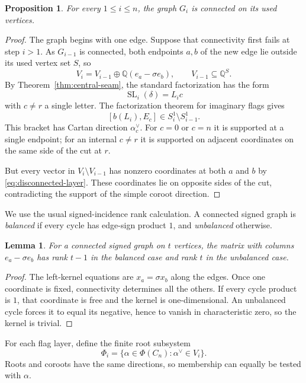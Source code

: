\documentclass[11pt]{amsart}
\numberwithin{equation}{section}
\newtheorem{lemma}[theorem]{Lemma}
\newtheorem{proposition}[theorem]{Proposition}
\theoremstyle{definition}
\DeclareMathOperator{\SL}{SL}
\newcommand{\Q}{\mathbb Q}
\newcommand{\br}[1]{b(#1)}
\begin{document}
\begin{proposition}\label{prop:flag-connected}
For every $1\leq i\leq n$, the graph $G_i$ is connected on its used vertices.
\end{proposition}
\begin{proof}
The graph begins with one edge. Suppose that connectivity first fails at step $i>1$. As $G_{i-1}$ is connected, both endpoints $a,b$ of the new edge lie outside its used vertex set $S$, so
\begin{equation}\label{eq:disconnected-layer}
 V_i=V_{i-1}\oplus\Q(e_a-\sigma e_b),
 \qquad V_{i-1}\subseteq\Q^S.
\end{equation}
By Theorem~\ref{thm:central-seam}, the standard factorization has the form
\[
 \SL_i(\delta)=L_i c
\]
with $c\ne r$ a single letter. The factorization theorem for imaginary flags \cite[Proposition~3.10 and Corollary~3.11]{ETC} gives
\[
 [\br{L_i},E_c]\in S_i^1\setminus S_{i-1}^1.
\]
This bracket has Cartan direction $\alpha_c^{\vee}$. For $c=0$ or $c=n$ it is supported at a single endpoint; for an internal $c\ne r$ it is supported on adjacent coordinates on the same side of the cut at $r$.

But every vector in $V_i\setminus V_{i-1}$ has nonzero coordinates at both $a$ and $b$ by \eqref{eq:disconnected-layer}. These coordinates lie on opposite sides of the cut, contradicting the support of the simple coroot direction.
\end{proof}

We use the usual signed-incidence rank calculation. A connected signed graph is \emph{balanced} if every cycle has edge-sign product $1$, and \emph{unbalanced} otherwise.

\begin{lemma}\label{lem:signed-rank}
For a connected signed graph on $t$ vertices, the matrix with columns $e_a-\sigma e_b$ has rank $t-1$ in the balanced case and rank $t$ in the unbalanced case.
\end{lemma}
\begin{proof}
The left-kernel equations are $x_a=\sigma x_b$ along the edges. Once one coordinate is fixed, connectivity determines all the others. If every cycle product is $1$, that coordinate is free and the kernel is one-dimensional. An unbalanced cycle forces it to equal its negative, hence to vanish in characteristic zero, so the kernel is trivial.
\end{proof}

For each flag layer, define the finite root subsystem
\[
 \Phi_i=\{\alpha\in\Phi(C_n):\alpha^{\vee}\in V_i\}.
\]
Roots and coroots have the same directions, so membership can equally be tested with $\alpha$.
\end{document}
